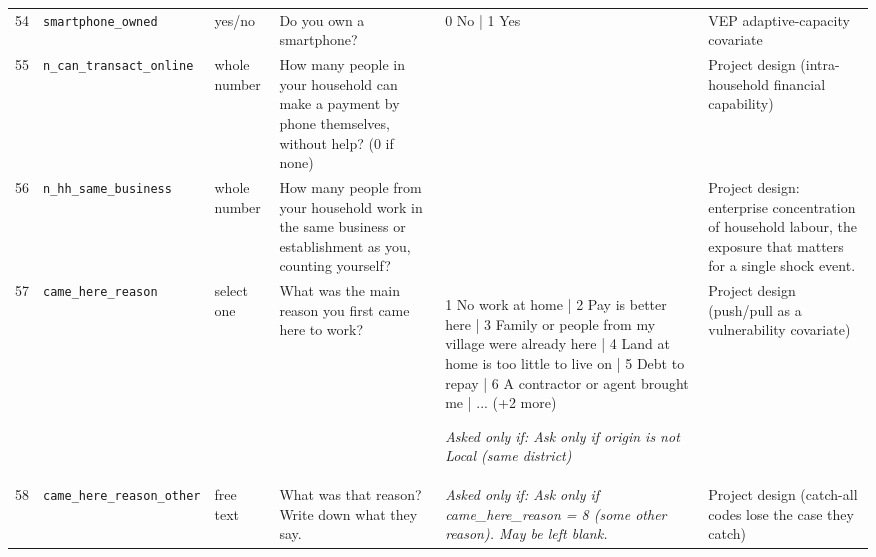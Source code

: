 \documentclass[9pt,a4paper,landscape]{article}
\begin{document}
\begin{longtable}{@{}p{0.5cm}p{3.3cm}p{1.7cm}p{7.3cm}p{5.6cm}p{5.4cm}@{}}
\footnotesize 54 & \footnotesize\texttt{smartphone\_owned} & \scriptsize yes/no & \footnotesize Do you own a smartphone?\par\vspace{1pt}{\footnotesize\color{hdr}{\hifont क्या आपके पास स्मार्टफ़ोन है?}} & \scriptsize 0 No | 1 Yes & \scriptsize VEP adaptive-capacity covariate\\
\footnotesize 55 & \footnotesize\texttt{n\_can\_transact\_online} & \scriptsize whole number & \footnotesize How many people in your household can make a payment by phone themselves, without help? (0 if none)\par\vspace{1pt}{\footnotesize\color{hdr}{\hifont आपके घर में कितने लोग बिना किसी की मदद के फ़ोन से पैसे भेज सकते हैं? (कोई नहीं तो 0)}} & \scriptsize  & \scriptsize Project design (intra-household financial capability)\\
\footnotesize 56 & \footnotesize\texttt{n\_hh\_same\_business} & \scriptsize whole number & \footnotesize How many people from your household work in the same business or establishment as you, counting yourself?\par\vspace{1pt}{\footnotesize\color{hdr}{\hifont आपके घर के कितने लोग आपके साथ उसी काम या उसी दुकान/धंधे में काम करते हैं, आपको भी गिनकर?}} & \scriptsize  & \scriptsize Project design: enterprise concentration of household labour, the exposure that matters for a single shock event.\\
\footnotesize 57 & \footnotesize\texttt{came\_here\_reason} & \scriptsize select one & \footnotesize What was the main reason you first came here to work?\par\vspace{1pt}{\footnotesize\color{hdr}{\hifont आप सबसे पहले यहाँ काम करने किस मुख्य वजह से आए थे?}} & \scriptsize 1 No work at home | 2 Pay is better here | 3 Family or people from my village were already here | 4 Land at home is too little to live on | 5 Debt to repay | 6 A contractor or agent brought me | ... (+2 more)\par\vspace{1pt}\textit{Asked only if: Ask only if origin is not Local (same district)} & \scriptsize Project design (push/pull as a vulnerability covariate)\\
\footnotesize 58 & \footnotesize\texttt{came\_here\_reason\_other} & \scriptsize free text & \footnotesize What was that reason? Write down what they say.\par\vspace{1pt}{\footnotesize\color{hdr}{\hifont वह वजह क्या थी? जो वे कहें वही लिख लें।}} & \scriptsize \textit{Asked only if: Ask only if came\_here\_reason = 8 (some other reason). May be left blank.} & \scriptsize Project design (catch-all codes lose the case they catch)\\

\end{longtable}
\end{document}
